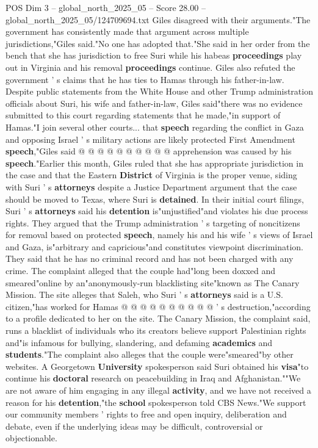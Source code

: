 \begin{textsample}{POS Dim 3 – global\_north\_2025\_05 – Score 28.00 – global\_north\_2025\_05/124709694.txt}
Giles disagreed with their arguments."The government has consistently made that argument across multiple jurisdictions,"Giles said."No one has adopted that."She said in her order from the bench that she has jurisdiction to free Suri while his habeas \textbf{proceedings} play out in Virginia and his removal \textbf{proceedings} continue.
Giles also refuted the government ' s claims that he has ties to Hamas through his father-in-law.
Despite public statements from the White House and other Trump administration officials about Suri, his wife and father-in-law, Giles said"there was no evidence submitted to this court regarding statements that he made,"in support of Hamas."I join several other courts... that \textbf{speech} regarding the conflict in Gaza and opposing Israel ' s military actions are likely protected First Amendment \textbf{speech},"Giles said @ @ @ @ @ @ @ @ @ @ apprehension was caused by his \textbf{speech}."Earlier this month, Giles ruled that she has appropriate jurisdiction in the case and that the Eastern \textbf{District} of Virginia is the proper venue, siding with Suri ' s \textbf{attorneys} despite a Justice Department argument that the case should be moved to Texas, where Suri is \textbf{detained}.
In their initial court filings, Suri ' s \textbf{attorneys} said his \textbf{detention} is"unjustified"and violates his due process rights.
They argued that the Trump administration ' s targeting of noncitizens for removal based on protected \textbf{speech}, namely his and his wife ' s views of Israel and Gaza, is"arbitrary and capricious"and constitutes viewpoint discrimination.
They said that he has no criminal record and has not been charged with any crime.
The complaint alleged that the couple had"long been doxxed and smeared"online by an"anonymously-run blacklisting site"known as The Canary Mission.
The site alleges that Saleh, who Suri ' s \textbf{attorneys} said is a U.S. citizen,"has worked for Hamas @ @ @ @ @ @ @ @ @ @ ' s destruction,"according to a profile dedicated to her on the site.
The Canary Mission, the complaint said, runs a blacklist of individuals who its creators believe support Palestinian rights and"is infamous for bullying, slandering, and defaming \textbf{academics} and \textbf{students}."The complaint also alleges that the couple were"smeared"by other websites.
A Georgetown \textbf{University} spokesperson said Suri obtained his \textbf{visa}"to continue his \textbf{doctoral} research on peacebuilding in Iraq and Afghanistan.""We are not aware of him engaging in any illegal \textbf{activity}, and we have not received a reason for his \textbf{detention},"the \textbf{school} spokesperson told CBS News."We support our community members ' rights to free and open inquiry, deliberation and debate, even if the underlying ideas may be difficult, controversial or objectionable.

\end{textsample}
